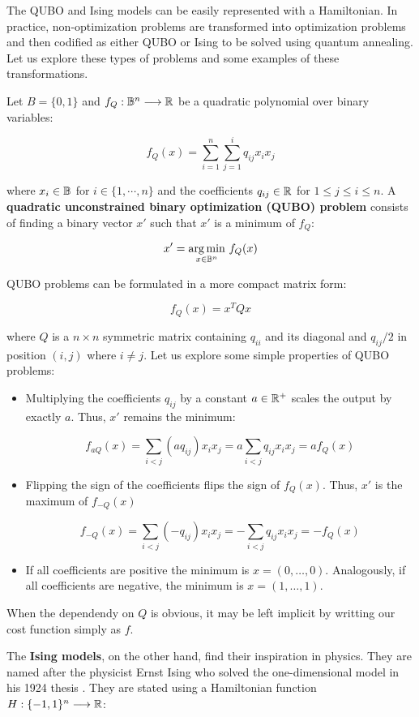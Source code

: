 The QUBO and Ising models can be easily represented with a Hamiltonian. In practice, non-optimization problems are transformed into optimization problems and then codified as either QUBO or Ising to be solved using quantum annealing. Let us explore these types of problems and some examples of these transformations.

Let $B = \{0,1\}$ and $f_Q: \mathbb{B}^n \longrightarrow \mathbb{R} $ be a quadratic polynomial over binary variables:

$$ f_Q(x) = \sum_{i=1}^n \sum_{j=1}^i q_{ij} x_i x_j $$

where $x_i \in \mathbb{B}$ for $i \in \{1, \cdots, n\}$ and the coefficients $q_{ij} \in \mathbb{R}$ for $1 \leq j \leq i \leq n$. A \textbf{quadratic unconstrained binary optimization (QUBO) problem} consists of finding a binary vector $x'$ such that $x'$ is a minimum of $f_Q$:

$$ x' = \underset {x \in \mathbb{B}^n }{\arg \min} ~ f_Q(x) $$

QUBO problems can be formulated in a more compact matrix form:

$$ f_Q(x) = x^T Q x $$

where $Q$ is a $n \times n$ symmetric matrix containing $q_{ii}$ and its diagonal and $q_{ij} / 2$ in position $(i,j)$ where $i \neq j$. Let us explore some simple properties of QUBO problems:

\begin{itemize}
	\item Multiplying the coefficients $q_{ij}$ by a constant $a \in \mathbb{R}^+$ scales the output by exactly $a$. Thus, $x'$ remains the minimum:
	
		$$ f_{aQ}(x) = \sum_{i<j} (a q_{ij}) x_i x_j  = a \sum_{i<j} q_{ij} x_i x_j = a f_Q(x) $$
		
	\item Flipping the sign of the coefficients flips the sign of $f_Q(x)$. Thus, $x'$ is the maximum of $f_{-Q}(x)$
	
		$$ f_{-Q}(x) = \sum_{i<j} (-q_{ij}) x_i x_j  = - \sum_{i<j} q_{ij} x_i x_j = -f_Q(x) $$
		
	\item If all coefficients are positive the minimum is $x = (0, \ldots, 0)$. Analogously, if all coefficients are negative, the minimum is $x = (1, \ldots, 1)$. 
\end{itemize}

When the dependendy on $Q$ is obvious, it may be left implicit by writting our cost function simply as $f$.

The \textbf{Ising models}, on the other hand, find their inspiration in physics. They are named after the physicist Ernst Ising who solved the one-dimensional model in his 1924 thesis \cite{Ising1924}. They are stated using a Hamiltonian function $H: \{-1, 1\}^n \longrightarrow \mathbb{R}$:

